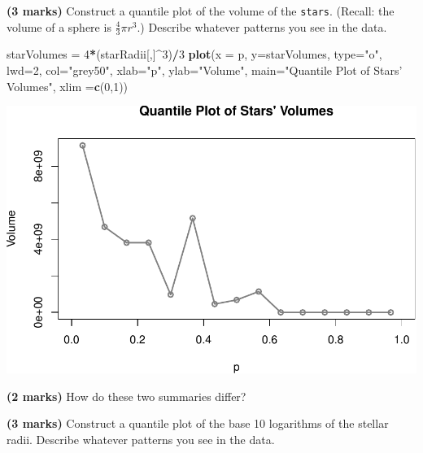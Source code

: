\documentclass[9pt,letter]{article}
\newenvironment{Shaded}{\begin{snugshade}}{\end{snugshade}}
\newcommand{\KeywordTok}[1]{\textcolor[rgb]{0.13,0.29,0.53}{\textbf{#1}}}
\newcommand{\DataTypeTok}[1]{\textcolor[rgb]{0.13,0.29,0.53}{#1}}
\newcommand{\DecValTok}[1]{\textcolor[rgb]{0.00,0.00,0.81}{#1}}
\newcommand{\StringTok}[1]{\textcolor[rgb]{0.31,0.60,0.02}{#1}}
\newcommand{\OperatorTok}[1]{\textcolor[rgb]{0.81,0.36,0.00}{\textbf{#1}}}
\newcommand{\NormalTok}[1]{#1}
\begin{document}
\item 

\textbf{(3 marks)} Construct a quantile plot of the volume of the
\texttt{stars}. (Recall: the volume of a sphere is
\(\frac{4}{3}\pi r^3\).) Describe whatever patterns you see in the data.

\begin{Shaded}
\begin{Highlighting}[]
\NormalTok{starVolumes =}\StringTok{ }\DecValTok{4}\OperatorTok{*}\NormalTok{(starRadii[,]}\OperatorTok{^}\DecValTok{3}\NormalTok{)}\OperatorTok{/}\DecValTok{3}
\KeywordTok{plot}\NormalTok{(}\DataTypeTok{x =}\NormalTok{ p, }\DataTypeTok{y=}\NormalTok{starVolumes, }
      \DataTypeTok{type=}\StringTok{"o"}\NormalTok{, }\DataTypeTok{lwd=}\DecValTok{2}\NormalTok{, }\DataTypeTok{col=}\StringTok{"grey50"}\NormalTok{,}
      \DataTypeTok{xlab=}\StringTok{"p"}\NormalTok{, }\DataTypeTok{ylab=}\StringTok{"Volume"}\NormalTok{,}
      \DataTypeTok{main=}\StringTok{"Quantile Plot of Stars' Volumes"}\NormalTok{,}
      \DataTypeTok{xlim =}\KeywordTok{c}\NormalTok{(}\DecValTok{0}\NormalTok{,}\DecValTok{1}\NormalTok{))}
\end{Highlighting}
\end{Shaded}

\includegraphics{a3_tests_files/figure-latex/unnamed-chunk-6-1.pdf}
\item \textbf{(2 marks)} How do these two summaries differ?

\item 

\textbf{(3 marks)} Construct a quantile plot of the base 10 logarithms
of the stellar radii. Describe whatever patterns you see in the data.
\end{document}
